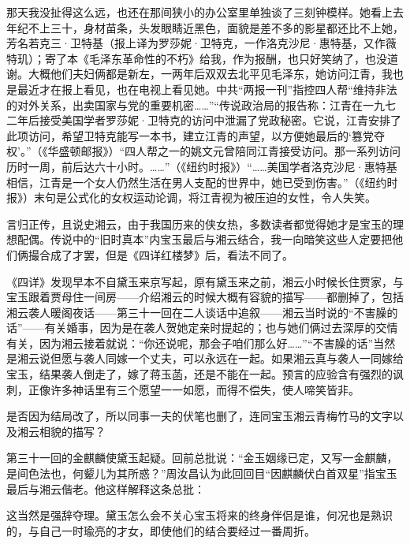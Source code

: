 \par 那天我没扯得这么远，也还在那间狭小的办公室里单独谈了三刻钟模样。她看上去年纪不上三十，身材苗条，头发眼睛近黑色，面貌是差不多的影星都还比不上她，芳名若克三·卫特基（报上译为罗莎妮·卫特克，一作洛克沙尼·惠特基，又作薇特玑）；寄了本《毛泽东革命性的不朽》给我，作为报酬，也只好笑纳了，也没道谢。大概他们夫妇俩都是新左，一两年后双双去北平见毛泽东，她访问江青，我也是最近才在报上看见，也在电视上看见她。中共“两报一刊”指控四人帮“维持非法的对外关系，出卖国家与党的重要机密……”“传说政治局的报告称：江青在一九七二年后接受美国学者罗莎妮·卫特克的访问中泄漏了党政秘密。它说，江青安排了此项访问，希望卫特克能写一本书，建立江青的声望，以方便她最后的‘篡党夺权’。”（《华盛顿邮报》）“四人帮之一的姚文元曾陪同江青接受访问。那一系列访问历时一周，前后达六十小时。……”（《纽约时报》）“……美国学者洛克沙尼·惠特基相信，江青是一个女人仍然生活在男人支配的世界中，她已受到伤害。”（《纽约时报》）末句是公式化的女权运动论调，将江青视为被压迫的女性，令人失笑。
\par 言归正传，且说史湘云，由于我国历来的侠女热，多数读者都觉得她才是宝玉的理想配偶。传说中的“旧时真本”内宝玉最后与湘云结合，我一向暗笑这些人定要把他们俩撮合成了才罢，但是《四详红楼梦》后，看法不同了。
\par 《四详》发现早本不自黛玉来京写起，原有黛玉来之前，湘云小时候长住贾家，与宝玉跟着贾母住一间房——介绍湘云的时候大概有容貌的描写——都删掉了，包括湘云袭人暖阁夜话——第三十一回在二人谈话中追叙——湘云当时说的“不害臊的话”——有关婚事，因为是在袭人贺她定亲时提起的；也与她们俩过去深厚的交情有关，因为湘云接着就说：“你还说呢，那会子咱们那么好……”“不害臊的话”当然是湘云说但愿与袭人同嫁一个丈夫，可以永远在一起。如果湘云真与袭人一同嫁给宝玉，结果袭人倒走了，嫁了蒋玉菡，还是不能在一起。预言的应验含有强烈的讽刺，正像许多神话里有三个愿望一一如愿，而得不偿失，使人啼笑皆非。
\par 是否因为结局改了，所以同事一夫的伏笔也删了，连同宝玉湘云青梅竹马的文字以及湘云相貌的描写？
\par 第三十一回的金麒麟使黛玉起疑。回前总批说：“金玉姻缘已定，又写一金麒麟，是间色法也，何颦儿为其所惑？”周汝昌认为此回回目“因麒麟伏白首双星”指宝玉最后与湘云偕老。他这样解释这条总批：
\par 这当然是强辞夺理。黛玉怎么会不关心宝玉将来的终身伴侣是谁，何况也是熟识的，与自己一时瑜亮的才女，即使他们的结合要经过一番周折。
